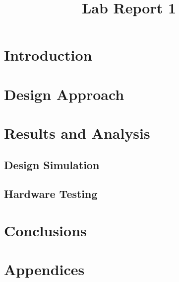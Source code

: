 \documentclass[12pt, letterpaper]{article}
\title{Lab Report 1}
\begin{document}
\maketitle

\tableofcontents
\section{Introduction}




\newpage
\section{Design Approach}




\newpage
\section{Results and Analysis}

\subsection{Design Simulation}

\subsection{Hardware Testing}


\newpage
\section{Conclusions}



\newpage
\section*{Appendices}
\end{document}
